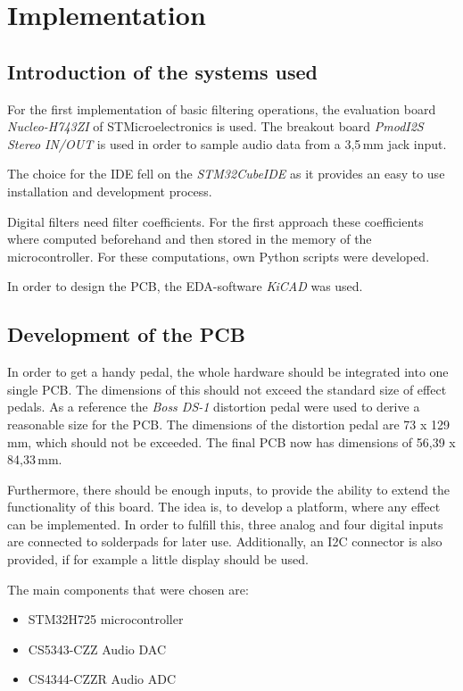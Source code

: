 \section{Implementation}

\subsection{Introduction of the systems used}

For the first implementation of basic filtering operations, the evaluation board \textit{Nucleo-H743ZI} of STMicroelectronics
is used. The breakout board \textit{PmodI2S Stereo IN/OUT} is used in order to sample audio data from a 3,5\,mm jack input.

The choice for the \ac{IDE} fell on the
\newline \textit{STM32CubeIDE} as it provides an easy to use installation and
development process.

Digital filters need filter coefficients. For the first approach these
coefficients where computed beforehand and then stored in the memory of the microcontroller. For these computations,
own Python scripts were developed.

In order to design the \ac{PCB}, the \ac{EDA}-software \textit{KiCAD} was used.

\subsection{Development of the PCB}

In order to get a handy pedal, the whole hardware should be integrated into one single \ac{PCB}.
The dimensions of this should not exceed the standard size of effect pedals. As a reference the
\textit{Boss DS-1} distortion pedal were used to derive a reasonable size for the \ac{PCB}. The dimensions of the
distortion pedal are 73 x 129\,mm, which should not be exceeded. The final \ac{PCB} now has dimensions of
56,39 x 84,33\,mm.

Furthermore, there should be enough inputs, to provide the ability to extend the functionality of this board.
The idea is, to develop a platform, where any effect can be implemented. In order to fulfill this, three analog and
four digital inputs are connected to solderpads for later use. Additionally, an \ac{I2C} connector is also
provided, if for example a little display should be used.

The main components that were chosen are:

\begin{itemize}
    \item STM32H725 microcontroller
    \item CS5343-CZZ Audio \ac{DAC}
    \item CS4344-CZZR Audio \ac{ADC}
\end{itemize}


